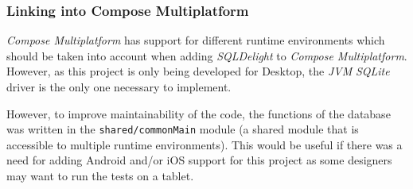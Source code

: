 \documentclass[../dissertation.tex]{subfiles}
\begin{document}
\subsubsection{Linking into Compose Multiplatform}

\textit{Compose Multiplatform} has support for different runtime environments which
should be taken into account when adding \textit{SQLDelight} to \textit{Compose Multiplatform}.
However, as this project is only being developed for Desktop, the \textit{JVM}
\textit{SQLite} driver is the only one necessary to implement.

However, to improve maintainability of the code, the functions of the database was
written in the \lstinline|shared/commonMain| module (a shared module that is accessible
to multiple runtime environments).
This would be useful if there was a need for
adding Android and/or iOS support for this project as some designers may want to
run the tests on a tablet.
\end{document}
